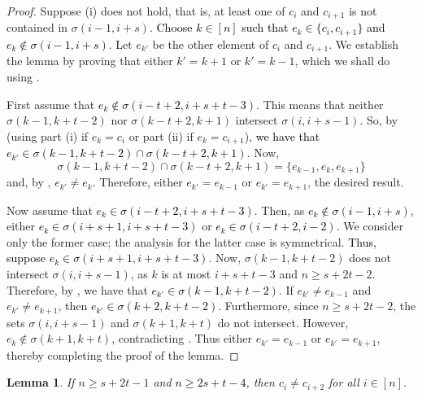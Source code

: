 \documentclass[11pt]{amsart}
\newtheorem{lemma}[theorem]{Lemma}
\newcommand{\blue}{\textcolor{black}}
\newcommand{\bloo}{\textcolor{black}}
\begin{document}
\begin{proof}
Suppose (i) does not hold, that is, at least one of $c_i$ and $c_{i+1}$ is not contained in $\sigma(i-1, i+s)$. \bloo{Choose $k \in [n]$ such that $e_k \in \{c_i,c_{i+1}\}$ and $e_k \notin \sigma(i-1, i+s)$}. Let $e_{k'}$ be the other element of $c_i$ and $c_{i+1}$. We establish the lemma by proving that either $k' = k+1$ or $k' = k-1$, which we shall do using .

First assume that \bloo{$e_k \notin \sigma(i-t+2, i+s+t-3)$}. This means that neither $\sigma(k-1, k+t-2)$ nor $\sigma(k-t+2, k+1)$ intersect $\sigma(i, i+s-1)$. So, by  (using part (i) if $e_k = c_i$ or part (ii) if $e_k = c_{i+1}$), \bloo{we have that $e_{k'} \in \sigma(k-1, k+t-2) \cap \sigma(k-t+2, k+1)$}. Now, 
\[\sigma(k-1, k+t-2) \cap \sigma(k-t+2, k+1) = \{e_{k-1}, e_k, e_{k+1}\}\]
 and, by , $e_{k'}\neq e_k$. Therefore, either $e_{k'} = e_{k-1}$ or $e_{k'} = e_{k+1}$, the desired result.

Now assume that \bloo{$e_k \in \sigma(i-t+2,i+s+t-3)$}. Then, as \bloo{$e_k \notin \sigma(i-1,i+s)$}, either \bloo{$e_k \in \sigma(i+s+1, i+s+t-3)$} or \bloo{$e_k \in \sigma(i-t+2,i-2)$}. We consider only the former case; the analysis for the latter case is symmetrical. \bloo{Thus, suppose $e_k \in \sigma(i+s+1, i+s+t-3)$}. Now, $\sigma(k-1, k+t-2)$ does not intersect $\sigma(i, i+s-1)$, as $k$ is at most $i+s+t-3$ and $n \geq s+2t-2$. Therefore, by , we have that \bloo{$e_{k'} \in \sigma(k-1,k+t-2)$}. If $e_{k'} \neq e_{k-1}$ and $e_{k'} \neq e_{k+1}$, then \bloo{$e_{k'} \in \sigma(k+2, k+t-2)$}. Furthermore, since $n\geq s+2t-2$, the sets $\sigma(i, i+s-1)$ and $\sigma(k+1, k+t)$ do not intersect. However, $e_k \notin \sigma(k+1, k+t)$, contradicting . Thus either $e_{k'}=e_{k-1}$ or $e_{k'}=e_{k+1}$, thereby completing the proof of the lemma.
\end{proof}

\begin{lemma}
\label{2apart_neq}
If $n \geq s+2t-1$ and \blue{$n \geq 2s+t-4$}, then $c_i\neq c_{i+2}$ for all $i \in [n]$.
\end{lemma}

\end{document}
